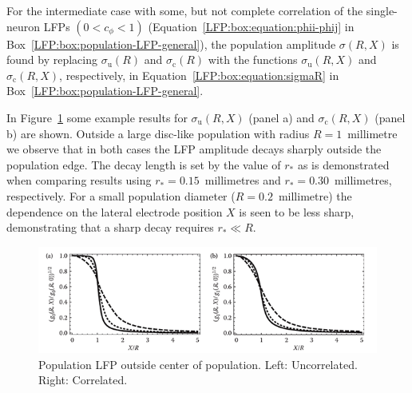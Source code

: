 For the intermediate case with some, but not complete correlation of the single-neuron LFPs $(0 < c_\phi < 1)$ 
(Equation~\ref{LFP:box:equation:phii-phij} in Box~\ref{LFP:box:population-LFP-general}), the population amplitude
$\sigma(R,X)$ is found by replacing $\sigma_\text{u}(R)$ and  $\sigma_\text{c}(R)$  with the functions
$\sigma_\text{u}(R,X)$ and  $\sigma_\text{c}(R,X)$, respectively, in 
Equation~\ref{LFP:box:equation:sigmaR} in Box~\ref{LFP:box:population-LFP-general}.

In Figure~\ref{LFP:fig:how-local-outside-population-center} some example results for
$\sigma_\text{u}(R,X)$ (panel a) and  $\sigma_\text{c}(R,X)$ (panel b) are shown. 
Outside a large disc-like population with radius $R=1$~millimetre we observe that in both cases
the LFP amplitude decays sharply outside the population edge. The decay length is set by the value
of $r_*$ as is demonstrated when comparing results using  $r_*=0.15$~millimetres and  $r_*=0.30$~millimetres, 
respectively. For a small population diameter ($R=0.2$~millimetre) the dependence on the lateral electrode position $X$ is seen to be
less sharp, demonstrating that a sharp decay requires $r_* \ll R$.

\begin{figure}
\begin{center}
\includegraphics{Figures/LFP/LFP-how-local-outside-population-center-w100-r150}
\end{center}
\caption[]{Population LFP outside center of population. 
Left: Uncorrelated. Right: Correlated.
}
\label{LFP:fig:how-local-outside-population-center}
\end{figure}

